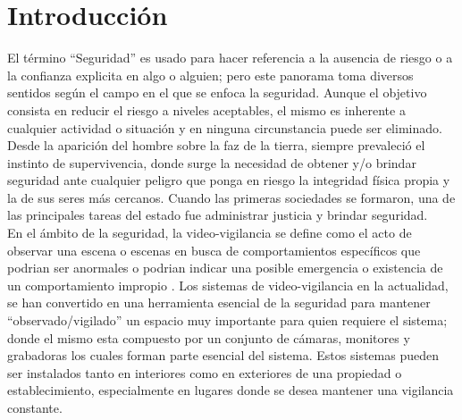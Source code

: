 \chapter{\centering Introducción}

El término ``Seguridad'' es usado para hacer referencia a la ausencia de riesgo o a la confianza explicita en algo o alguien; pero este panorama toma diversos sentidos según el campo en el que se enfoca la seguridad. Aunque el objetivo consista en reducir el riesgo a niveles aceptables, el mismo es inherente a cualquier actividad o situación y en ninguna circunstancia puede ser eliminado.\\

Desde la aparición del hombre sobre la faz de la tierra, siempre prevaleció el instinto de supervivencia, donde surge la necesidad de obtener y/o brindar seguridad ante cualquier peligro que ponga en riesgo la integridad física propia y la de sus seres más cercanos. Cuando las primeras sociedades se formaron, una de las principales tareas del estado fue administrar justicia y brindar seguridad.\\

En el ámbito de la seguridad, la video-vigilancia se define como el acto de observar una escena o escenas en busca de comportamientos específicos que podrian ser anormales o podrian indicar una posible emergencia o existencia de un comportamiento impropio \cite{NORMAN:201795}. Los sistemas de video-vigilancia en la actualidad, se han convertido en una herramienta esencial de la seguridad para mantener ``observado/vigilado'' un espacio muy importante para quien requiere el sistema; donde el mismo esta compuesto por un conjunto de cámaras, monitores y grabadoras los cuales forman parte esencial del sistema. Estos sistemas pueden ser instalados tanto en interiores como en exteriores de una propiedad o establecimiento, especialmente en lugares donde se desea mantener una vigilancia constante.\\

